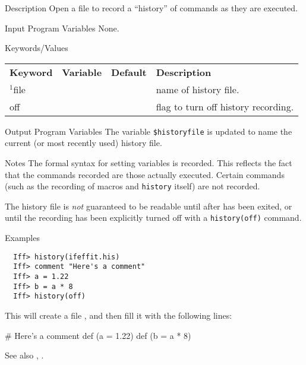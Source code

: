 \begin{IFFcom}
\item[Description] Open a file to record a ``history''  of {\ifeffit}
  commands as they are executed. 
\item[Input Program Variables] None.
\item[Keywords/Values] 
{\relax \hspace{0.25truein}\par\noindent\relax}
\begin{tabular}{llrl}
  \textbf{Keyword} & \textbf{Variable} & \textbf{Default} &
  \textbf{Description}\\
  \noalign{\smallskip}
  ${}^{1}${file} &      &  & name of history file. \\
  {off}          &    &  & flag to turn off history recording.\\
\end{tabular}

\item[Output Program Variables] The variable {\texttt{\$historyfile}} is
  updated to name the current (or most recently used) history file.

\item[Notes] The formal syntax for setting variables is recorded.  This
  reflects the fact that the commands recorded are those actually executed.
  Certain commands (such as the recording of macros and {\tt{history}}
  itself) are not recorded.  

  The history file is {\emph{not}} guaranteed to be readable until after
  {\ifeffit} has been exited,  or until the recording has been explicitly
  turned off with a {\tt{history(off)}} command.
\item[Examples] {\hspace{1.in} \vspace{-0.1truein} \relax }
\begin{verbatim} 
  Iff> history(ifeffit.his)
  Iff> comment "Here's a comment"
  Iff> a = 1.22
  Iff> b = a * 8
  Iff> history(off)
\end{verbatim}
\noindent
This will create a file {}, and then fill it with the 
following lines:

{\small{
\begin{VerbSBox}
 # Here's a comment
 def (a = 1.22)
 def (b = a * 8)
\end{VerbSBox}
}}\noindent

\item[See also] {}, {}. 
\end{IFFcom}


